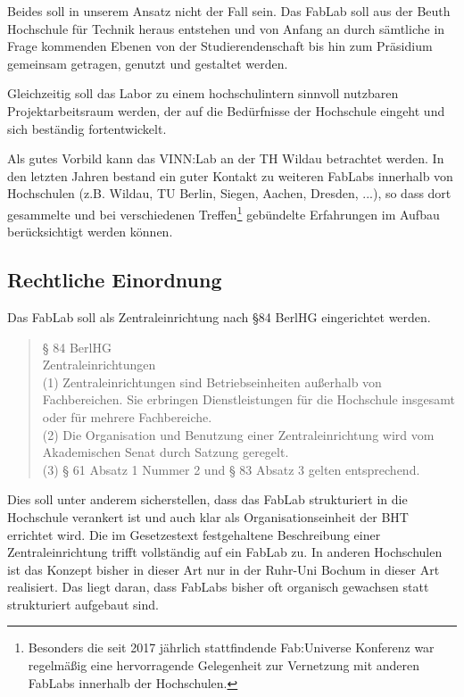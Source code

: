 \documentclass[parskip=half,headsepline,footsepline,titlepage]{scrartcl}
\begin{document}
Beides soll in unserem Ansatz nicht der Fall sein. Das FabLab soll aus der Beuth Hochschule für Technik heraus entstehen und von Anfang an durch sämtliche in Frage kommenden Ebenen von der Studierendenschaft bis hin zum Präsidium gemeinsam getragen, genutzt und gestaltet werden.

Gleichzeitig soll das Labor zu einem hochschulintern sinnvoll nutzbaren Projektarbeitsraum werden, der auf die Bedürfnisse der Hochschule eingeht und sich beständig fortentwickelt.

Als gutes Vorbild kann das VINN:Lab an der TH Wildau betrachtet werden. In den letzten Jahren bestand ein guter Kontakt zu weiteren FabLabs innerhalb von Hochschulen (z.B. Wildau, TU Berlin, Siegen, Aachen, Dresden, ...), so dass dort gesammelte und bei verschiedenen Treffen\footnote{Besonders die seit 2017 jährlich stattfindende Fab:Universe Konferenz war regelmäßig eine hervorragende Gelegenheit zur Vernetzung mit anderen FabLabs innerhalb der Hochschulen.} gebündelte Erfahrungen im Aufbau berücksichtigt werden können.

\subsection{Rechtliche Einordnung}
Das FabLab soll als Zentraleinrichtung nach §84 BerlHG eingerichtet werden.

\begin{quote}
§ 84 BerlHG\\
Zentraleinrichtungen\\
(1) Zentraleinrichtungen sind Betriebseinheiten außerhalb von Fachbereichen. Sie erbringen Dienstleistungen für die Hochschule insgesamt oder für mehrere Fachbereiche.\\
(2) Die Organisation und Benutzung einer Zentraleinrichtung wird vom Akademischen Senat durch Satzung geregelt.\\
(3) § 61 Absatz 1 Nummer 2 und § 83 Absatz 3 gelten entsprechend.
\end{quote}

Dies soll unter anderem sicherstellen, dass das FabLab strukturiert in die Hochschule verankert ist und auch klar als Organisationseinheit der BHT errichtet wird.
Die im Gesetzestext festgehaltene Beschreibung einer Zentraleinrichtung trifft vollständig auf ein FabLab zu. In anderen Hochschulen ist das Konzept bisher in dieser Art nur in der Ruhr-Uni Bochum in dieser Art realisiert. Das liegt daran, dass FabLabs bisher oft organisch gewachsen statt strukturiert aufgebaut sind.
\end{document}
